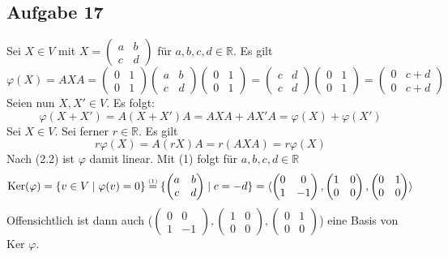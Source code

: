 \documentclass[a4paper,graphics,11pt]{article}
\newcommand{\aufgabe}[1]{\subsection*{Aufgabe #1}}
\newcommand{\up}[2]{\mathrel{\overset{\makebox[0pt]{\mbox{\normalfont\tiny #2}}}{#1}}}
\begin{document}
\aufgabe{17}
Sei $X \in V$ mit
$X = \begin{pmatrix}
        a & b\\
	    c & d
    \end{pmatrix}
$
für $a,b,c,d \in \mathbb{R}$. Es gilt
\begin{equation}
    \varphi(X)
    = AXA
    = \begin{pmatrix}
		0 & 1\\
		0 & 1
	\end{pmatrix}
    \begin{pmatrix}
		a & b\\
		c & d
	\end{pmatrix}
    \begin{pmatrix}
		0 & 1\\
		0 & 1
	\end{pmatrix}
    = \begin{pmatrix}
		c & d\\
		c & d
	\end{pmatrix}
    \begin{pmatrix}
		0 & 1\\
		0 & 1
	\end{pmatrix}
    = 
    \begin{pmatrix}
		0 & c+d\\
		0 & c+d
	\end{pmatrix}
\end{equation}
Seien nun $X, X' \in V$.
Es folgt:
$$
    \varphi(X+X')
    = A(X+X')A
    = AXA+AX'A
    = \varphi(X) + \varphi(X')
$$
Sei $X \in V$. Sei ferner $r \in \mathbb{R}$. Es gilt
$$
    r\varphi(X)
    = A(rX)A
    = r(AXA)
    = r\varphi(X)
$$
Nach (2.2) ist $\varphi$ damit linear.
\newpage
Mit (1) folgt für $a,b,c,d \in \mathbb{R}$
$$
    \text{Ker}(\varphi)
    = \{v \in V \mid \varphi(v) = 0\}
    \up{=}{(1)} \{\begin{pmatrix}
        a & b\\
        c & d
	\end{pmatrix}
    \mid c = -d\}
    =
    \langle
    \begin{pmatrix}
        0 & 0\\
        1 & -1
	\end{pmatrix},
    \begin{pmatrix}
        1 & 0\\
        0 & 0
	\end{pmatrix},
    \begin{pmatrix}
        0 & 1\\
        0 & 0
	\end{pmatrix}
    \rangle
$$
Offensichtlich ist dann auch ($\begin{pmatrix}
        0 & 0\\
        1 & -1
	\end{pmatrix},
    \begin{pmatrix}
        1 & 0\\
        0 & 0
	\end{pmatrix},
    \begin{pmatrix}
        0 & 1\\
        0 & 0
	\end{pmatrix}
$)
eine Basis von Ker $\varphi$.
\end{document}
